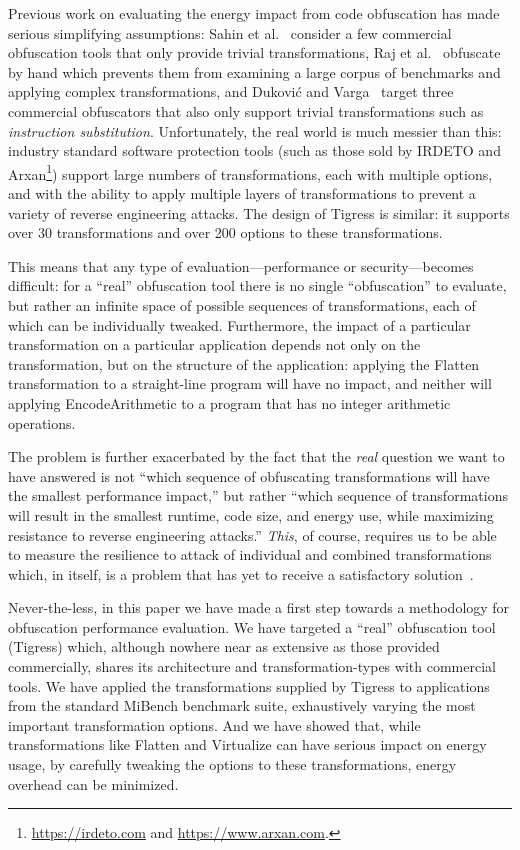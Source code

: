 Previous work on evaluating the energy impact from code obfuscation has made serious simplifying assumptions: Sahin et al.~\cite{6976079} consider a few commercial obfuscation tools that only provide trivial transformations, Raj et al.~\cite{raj2017modelling} obfuscate by hand which prevents them from examining a large corpus of benchmarks and applying complex transformations, and Dukovi\'{c} and Varga~\cite{dhukovic2015load} target three commercial obfuscators that also only support trivial transformations such as {\em instruction substitution}. Unfortunately, the real world is much messier than this: industry standard software protection tools (such as those sold by IRDETO and Arxan\footnote{\url{https://irdeto.com} and \url{https://www.arxan.com}.}) support large numbers of transformations, each with multiple options, and with the ability to apply multiple layers of transformations to prevent a variety of reverse engineering attacks. 
The design of Tigress is similar: it supports over 30 transformations and over 200 options to these transformations.

This means that any type of evaluation---performance or security---becomes difficult: for a ``real'' obfuscation tool there is no single ``obfuscation'' to evaluate, but rather an infinite space of possible sequences of transformations, each of which can be individually tweaked. Furthermore, the impact of a particular transformation on a particular application depends not only on the transformation, but on the structure of the application: applying the Flatten transformation to a straight-line program will have no impact, and neither will applying EncodeArithmetic to a program that has no integer arithmetic operations.

The problem is further exacerbated by the fact that the {\em real} question we want to have answered is not ``which sequence of obfuscating transformations will have the smallest performance impact,'' but rather ``which sequence of transformations will result in the smallest runtime, code size, and energy use, while maximizing resistance to reverse engineering attacks.'' {\em This}, of course, requires us to be able to measure the resilience to attack of individual and combined transformations which, in itself, is a problem that has yet to receive a satisfactory solution~\cite{banescu2017characterizing,wu2010framework}.

Never-the-less, in this paper we have made a first step towards a methodology for obfuscation performance evaluation. We have targeted a ``real'' obfuscation tool (Tigress) which, although nowhere near as extensive as those provided commercially, shares its architecture and transformation-types with commercial tools. We have applied the transformations supplied by Tigress to applications from the standard MiBench benchmark suite, exhaustively varying the most important transformation options. And we have showed that, while transformations like Flatten and Virtualize can have serious impact on energy usage, by carefully tweaking the options to these transformations, energy overhead can be minimized.